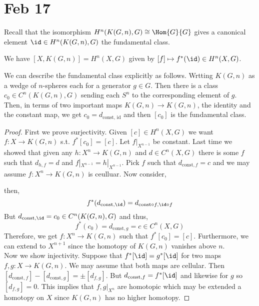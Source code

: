 \documentclass[12pt]{extarticle}
\begin{document}
\section{Feb 17}

Recall that the isomorphism $H^n(K(G, n), G) \cong \Hom{G}{G}$ gives a canonical element $\id \in H^n(K(G,n), G)$ the fundamental class.

\begin{thm}
We have $[X, K(G, n)] = H^n(X, G)$ given by $[f] \mapsto f^*(\id) \in H^n(X, G)$. 
\end{thm}



\begin{rmk}
We can describe the fundamental class explicitly as follows. Wrtting $K(G, n)$ as a wedge of $n$-spheres each for a generator $g \in G$. Then there is a class $c_0 \in C^n(K(G,n), G)$ sending each $S^n$ to the corresponding element of $g$. Then, in terms of two important maps $K(G, n) \to K(G,n)$, the identity and the constant map, we get $c_0 = d_{\text{const, id}}$ and then $[c_0]$ is the fundamental class.
\end{rmk}


\begin{proof}
First we prove surjectivity. Given $[c] \in H^n(X, G)$ we want $f : X \to K(G, n)$ s.t. $f^*[c_0] = [c]$. Let $f |_{X^{n-1}}$ be constant. Last time we showed that given any $h : X^n \to K(G, n)$ and $d \in C^n(X, G)$ there is some $f$ such that $d_{h, f} = d$ and $f|_{X^{n-1}} = h|_{X^{n-1}}$. Pick $f$ such that $d_{\text{const}, f} = c$ and we may assume $f : X^n \to K(G, n)$ is ceulluar.  Now consider,
\begin{center}
\end{center}
then,
\[ f^*(d_{\text{const}, \id}) = d_{\text{const} \circ f, \id \circ f} \]
But $d_{\text{const}, \id} = c_0 \in C^n(K(G, n), G)$ and thus,
\[ f^*(c_0) = d_{\text{const}, g} = c \in C^n(X, G) \]
Therefore, we get $f : X^n \to K(G, n)$ such that $f^* [c_0] = [c]$. Furthermore, we can extend to $X^{n+1}$ since the homotopy of $K(G, n)$ vanishes above $n$. 
\bigskip\\
Now we show injectivity. Suppose that $f^*[\id] = g^*[\id]$ for two maps $f, g : X \to K(G, n)$. We may assume that both maps are cellular. Then $[d_{\text{const}, f} ] - [d_{\text{const}, g}] = \pm [d_{f,g}]$. But $d_{\text{const}, f} = f^*[\id]$ and likewise for $g$ so $[d_{f,g}] = 0$. This implies that $f, g |_{X^n}$ are homotopic which may be extended a homotopy on $X$ since $K(G, n)$ has no higher homotopy. 
\end{proof}
\end{document}
